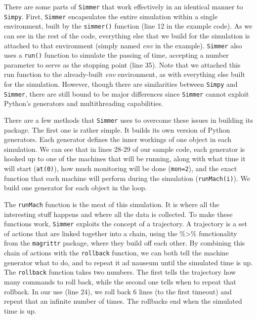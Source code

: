 \documentclass[a4paper, 11pt]{article} %
\begin{document}


There are some parts of \texttt{Simmer} that work effectively in an identical manner to \texttt{Simpy}. First, \texttt{Simmer} encapsulates the entire simulation within a single environment, built by the \texttt{simmer()} function (line 12 in the example code). As we can see in the rest of the code, everything else that we build for the simulation is attached to that environment (simply named \textit{env} in the example). \texttt{Simmer} also uses a \texttt{run()} function to simulate the passing of time, accepting a number parameter to serve as the stopping point (line 35). Note that we attached this run function to the already-built \textit{env} environment, as with everything else built for the simulation. However, though there are similarities between \texttt{Simpy} and \texttt{Simmer}, there are still bound to be major differences since \texttt{Simmer} cannot exploit Python's generators and multithreading capabilities.

There are a few methods that \texttt{Simmer} uses to overcome these issues in building its package. The first one is rather simple. It builds its own version of Python generators. Each generator defines the inner workings of one object in each simulation. We can see that in lines 28-29 of our sample code, each generator is hooked up to one of the machines that will be running, along with what time it will start (\texttt{at(0)}), how much monitoring will be done (\texttt{mon=2}), and the exact function that each machine will perform during the simulation (\texttt{runMach(i)}). We build one generator for each object in the loop.

The \texttt{runMach} function is the meat of this simulation. It is where all the interesting stuff happens and where all the data is collected. To make these functions work, \texttt{Simmer} exploits the concept of a trajectory. A trajectory is a set of actions that are linked together into a chain, using the \%>\% functionality from the \texttt{magrittr} package, where they build off each other. By combining this chain of actions with the \texttt{rollback} function, we can both tell the machine generator what to do, and to repeat it ad nauseum until the simulated time is up. The \texttt{rollback} function takes two numbers. The first tells the trajectory how many commands to roll back, while the second one tells when to repeat that rollback. In our use (line 24), we roll back 6 lines (to the first timeout) and repeat that an infinite number of times. The rollbacks end when the simulated time is up.
\end{document}
